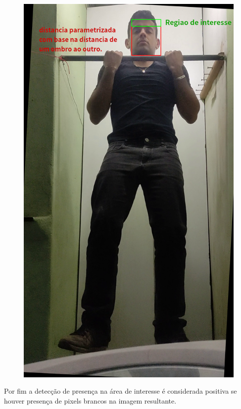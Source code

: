 \begin{figure}[H]
\begin{minipage}{\sizeImg\textwidth}
            \includegraphics[width=\textwidth]{figuras/ultrapassar_barra/133_image_with_legend.png}
        \end{minipage}
    \label{fig:Mascara_ultrapassar_barra}
\end{figure}


Por fim a detecção de presença na área de interesse é considerada positiva se houver presença de pixels brancos na imagem resultante.

